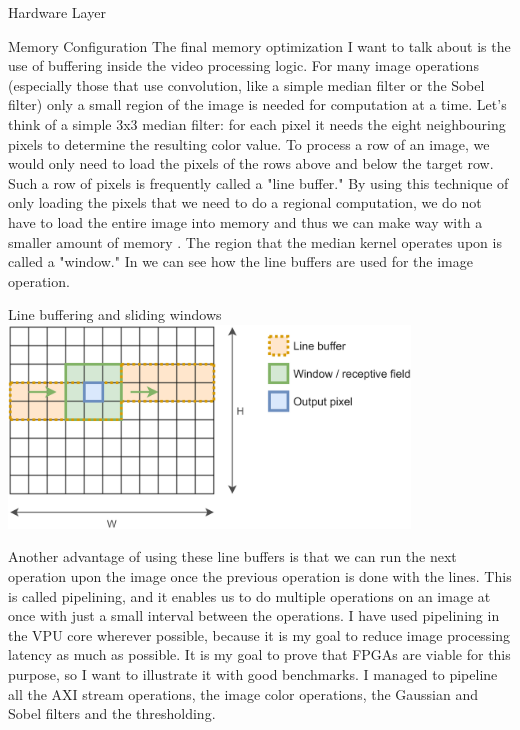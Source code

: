 \documentclass{matthijs}
\begin{document}
\begin{hoofdstuk}{Hardware Layer}
\begin{paragraaf}{Memory Configuration}
			The final memory optimization I want to talk about is the use of buffering inside the video processing logic.
			For many image operations (especially those that use convolution, like a simple median filter or the Sobel filter) only a small region of the image is needed for computation at a time.
			Let's think of a simple 3x3 median filter: for each pixel it needs the eight neighbouring pixels to determine the resulting color value.
			To process a row of an image, we would only need to load the pixels of the rows above and below the target row.
			Such a row of pixels is frequently called a "line buffer."
			By using this technique of only loading the pixels that we need to do a regional computation, we do not have to load the entire image into memory and thus we can make way with a smaller amount of memory \cite{hoorick2019convolution}.
			The region that the median kernel operates upon is called a "window."
			In  we can see how the line buffers are used for the image operation.
			
			\begin{figuur}{Line buffering and sliding windows}
				\includegraphics[width=0.8\textwidth]{hoorick2019-convolutions.png}
				\cite{hoorick2019convolution}
			\end{figuur}

			Another advantage of using these line buffers is that we can run the next operation upon the image once the previous operation is done with the lines.
			This is called pipelining, and it enables us to do multiple operations on an image at once with just a small interval between the operations.
			I have used pipelining in the VPU core wherever possible, because it is my goal to reduce image processing latency as much as possible.
			It is my goal to prove that FPGAs are viable for this purpose, so I want to illustrate it with good benchmarks.
			I managed to pipeline all the AXI stream operations, the image color operations, the Gaussian and Sobel filters and the thresholding.
			

\end{paragraaf}
\end{hoofdstuk}
\end{document}
